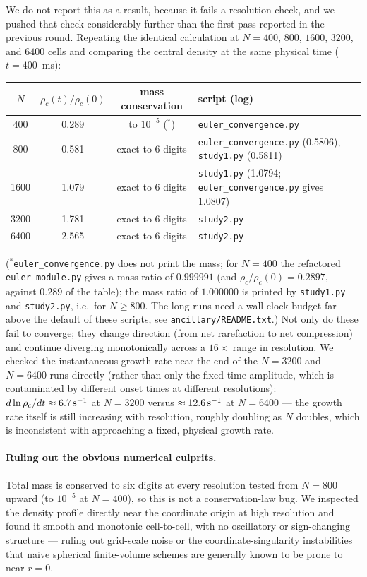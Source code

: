 \documentclass[11pt]{article}
\begin{document}
We do not report this as a result, because it fails a resolution check, and we pushed that check considerably further than the first pass reported in the previous round. Repeating the identical calculation at $N=400$, $800$, $1600$, $3200$, and $6400$ cells and comparing the central density at the same physical time ($t=400$~ms):
\begin{center}
\begin{tabular}{cccl}
\hline
$N$ & $\rho_c(t)/\rho_c(0)$ & mass conservation & script (log) \\
\hline
400 & 0.289 & to $10^{-5}$ ($^{*}$) & \texttt{euler\_convergence.py} \\
800 & 0.581 & exact to 6 digits & \texttt{euler\_convergence.py} (0.5806), \texttt{study1.py} (0.5811) \\
1600 & 1.079 & exact to 6 digits & \texttt{study1.py} (1.0794; \texttt{euler\_convergence.py} gives 1.0807) \\
3200 & 1.781 & exact to 6 digits & \texttt{study2.py} \\
6400 & 2.565 & exact to 6 digits & \texttt{study2.py} \\
\hline
\end{tabular}
\end{center}
($^{*}$\texttt{euler\_convergence.py} does not print the mass; for $N=400$ the refactored \texttt{euler\_module.py} gives a mass ratio of $0.999991$ (and $\rho_c/\rho_c(0)=0.2897$, against $0.289$ of the table); the mass ratio of $1.000000$ is printed by \texttt{study1.py} and \texttt{study2.py}, i.e.\ for $N\ge800$. The long runs need a wall-clock budget far above the default of these scripts, see \texttt{ancillary/README.txt}.) Not only do these fail to converge; they change direction (from net rarefaction to net compression) and continue diverging monotonically across a $16\times$ range in resolution. We checked the instantaneous growth rate near the end of the $N=3200$ and $N=6400$ runs directly (rather than only the fixed-time amplitude, which is contaminated by different onset times at different resolutions): $d\ln\rho_c/dt\approx6.7\,{\rm s}^{-1}$ at $N=3200$ versus $\approx12.6\,{\rm s}^{-1}$ at $N=6400$ --- the growth rate itself is still increasing with resolution, roughly doubling as $N$ doubles, which is inconsistent with approaching a fixed, physical growth rate.

\paragraph{Ruling out the obvious numerical culprits.} Total mass is conserved to six digits at every resolution tested from $N=800$ upward (to $10^{-5}$ at $N=400$), so this is not a conservation-law bug. We inspected the density profile directly near the coordinate origin at high resolution and found it smooth and monotonic cell-to-cell, with no oscillatory or sign-changing structure --- ruling out grid-scale noise or the coordinate-singularity instabilities that naive spherical finite-volume schemes are generally known to be prone to near $r=0$.
\end{document}

